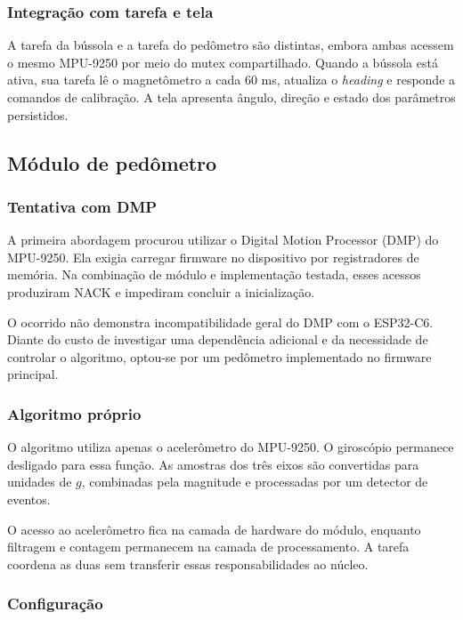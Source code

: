 \documentclass[a4paper,12pt]{article}
\begin{document}
\subsubsection{Integra\c{c}\~ao com tarefa e tela}


A tarefa da b\'ussola e a tarefa do ped\^ometro s\~ao distintas, embora ambas acessem o mesmo MPU-9250 por meio do mutex compartilhado. Quando a b\'ussola est\'a ativa, sua tarefa l\^e o magnet\^ometro a cada 60 ms, atualiza o \emph{heading} e responde a comandos de calibra\c{c}\~ao. A tela apresenta \^angulo, dire\c{c}\~ao e estado dos par\^ametros persistidos.


\subsection{M\'odulo de ped\^ometro}


\subsubsection{Tentativa com DMP}


A primeira abordagem procurou utilizar o Digital Motion Processor (DMP) do MPU-9250. Ela exigia carregar firmware no dispositivo por registradores de mem\'oria. Na combina\c{c}\~ao de m\'odulo e implementa\c{c}\~ao testada, esses acessos produziram NACK e impediram concluir a inicializa\c{c}\~ao.


O ocorrido n\~ao demonstra incompatibilidade geral do DMP com o ESP32-C6. Diante do custo de investigar uma depend\^encia adicional e da necessidade de controlar o algoritmo, optou-se por um ped\^ometro implementado no firmware principal.


\subsubsection{Algoritmo pr\'oprio}


O algoritmo utiliza apenas o aceler\^ometro do MPU-9250. O girosc\'opio permanece desligado para essa fun\c{c}\~ao. As amostras dos tr\^es eixos s\~ao convertidas para unidades de $g$, combinadas pela magnitude e processadas por um detector de eventos.


O acesso ao aceler\^ometro fica na camada de hardware do m\'odulo, enquanto filtragem e contagem permanecem na camada de processamento. A tarefa coordena as duas sem transferir essas responsabilidades ao n\'ucleo.


\subsubsection{Configura\c{c}\~ao}
\end{document}
